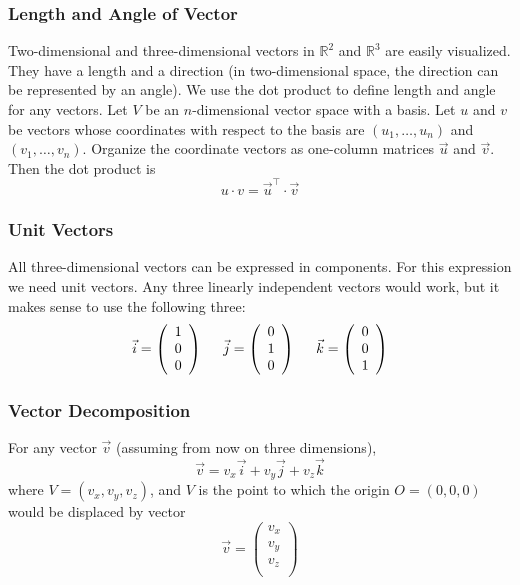 \documentclass[xcolor=dvipsnames]{beamer}
\begin{document}
\begin{frame}
  \frametitle{Length and Angle of Vector}
  Two-dimensional and three-dimensional vectors in $\mathbb{R}^{2}$
  and $\mathbb{R}^{3}$ are easily visualized. They have a length and a
  direction (in two-dimensional space, the direction can be
  represented by an angle). We use the dot product to define length
  and angle for any vectors. Let $V$ be an $n$-dimensional vector
  space with a basis. Let $u$ and $v$ be vectors whose coordinates
  with respect to the basis are $(u_{1},{\ldots},u_{n})$ and
  $(v_{1},{\ldots},v_{n})$. Organize the coordinate vectors as
  one-column matrices $\vec{u}$ and $\vec{v}$. Then the dot product is
  \begin{equation}
    \label{eq:emiehoij}
    u\cdot{}v=\vec{u}^{\intercal}\cdot\vec{v}
  \end{equation}
\end{frame}

\begin{frame}
  \frametitle{Unit Vectors}
  All three-dimensional vectors can be expressed in components. For
  this expression we need unit vectors. Any three linearly independent
  vectors would work, but it makes sense to use the following three:
  \begin{equation}
    \label{eq:bahniech}
    \vec{i}=\left(
    \begin{array}{c}
      1 \\
      0 \\
      0
    \end{array}\right)\hspace{.2in}
    \vec{j}=\left(
    \begin{array}{c}
      0 \\
      1 \\
      0
    \end{array}\right)\hspace{.2in}
    \vec{k}=\left(
    \begin{array}{c}
      0 \\
      0 \\
      1
    \end{array}\right)
  \end{equation}
\end{frame}

\begin{frame}
  \frametitle{Vector Decomposition}
  For any vector $\vec{v}$  (assuming from now on three dimensions),
  \begin{equation}
    \label{eq:teequahg}
    \vec{v}=v_{x}\vec{i}+v_{y}\vec{j}+v_{z}\vec{k}
  \end{equation}
where $V=(v_{x},v_{y},v_{z})$, and $V$ is the point to which the
origin $O=(0,0,0)$ would be displaced by vector
\begin{equation}
  \label{eq:zaegiexo}
  \vec{v}=\left(
    \begin{array}{c}
      v_{x} \\
      v_{y} \\
      v_{z} \\
    \end{array}\right)
\end{equation}
\end{frame}
\end{document}
